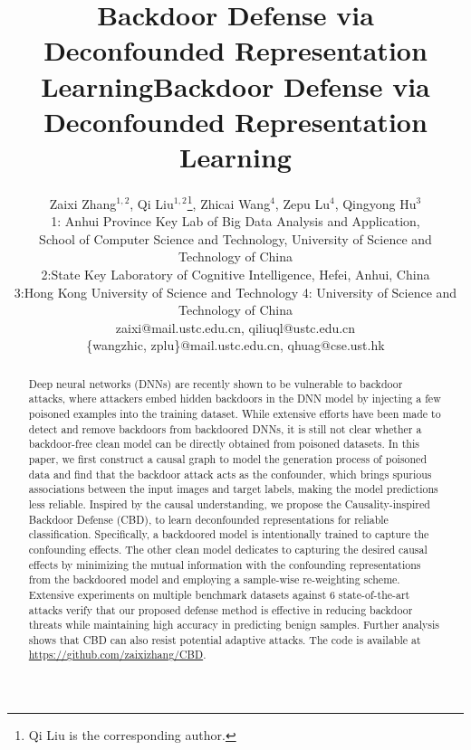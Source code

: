 \title{Backdoor Defense via Deconfounded Representation Learning}



\title{Backdoor Defense via Deconfounded Representation Learning}

\author{%
	Zaixi Zhang$^{1,2}$, Qi Liu$^{1,2}$\thanks{Qi Liu is the corresponding author.}, Zhicai Wang$^4$, Zepu Lu$^{4}$, Qingyong Hu$^{3}$\\
	1: Anhui Province Key Lab of Big Data Analysis and Application,\\ School of Computer Science and Technology, University of Science and Technology of China\\2:State Key Laboratory of Cognitive Intelligence, Hefei, Anhui, China\\3:Hong Kong University of Science and Technology 4: University of Science and Technology of China\\
	zaixi@mail.ustc.edu.cn, qiliuql@ustc.edu.cn\\ \{wangzhic, zplu\}@mail.ustc.edu.cn, qhuag@cse.ust.hk
}
\maketitle

\begin{abstract}
Deep neural networks (DNNs) are recently shown to be vulnerable to backdoor attacks, where attackers embed hidden backdoors in the DNN model by injecting a few poisoned examples into the training dataset. While extensive efforts have been made to detect and remove backdoors from backdoored DNNs, it is still not clear whether a backdoor-free clean model can be directly obtained from poisoned datasets. In this paper, we first construct a causal graph to model the generation process of poisoned data and find that the backdoor attack acts as the confounder, which brings spurious associations between the input images and target labels, making the model predictions less reliable. Inspired by the causal understanding, we propose the Causality-inspired Backdoor Defense (CBD), to learn deconfounded representations for reliable classification. Specifically, a backdoored model is intentionally trained to capture the confounding effects. The other clean model dedicates to capturing the desired causal effects by minimizing the mutual information with the confounding representations from the backdoored model and employing a sample-wise re-weighting scheme. Extensive experiments on multiple benchmark datasets against 6 state-of-the-art attacks verify that our proposed defense method is effective in reducing backdoor threats while maintaining high accuracy in predicting benign samples. Further analysis shows that CBD can also resist potential adaptive attacks. The code is available at \url{https://github.com/zaixizhang/CBD}. 
\end{abstract}

